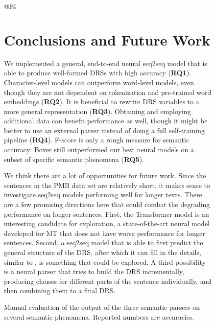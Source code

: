 \documentclass[11pt,a4paper]{article}
\begin{document}
\begin{figure*}[!t]
\begin{subfigure}{50mm}
{{\begin{tabular}[t]{@{}l@{}}
{\begin{table}[t]
\centering
{}
\caption{Manual evaluation of the output of the three semantic parsers on several semantic phenomena. Reported numbers are accuracies.}
\label{tab:manual_eval}
\end{table}

\section{Conclusions and Future Work}
\label{sec:conclusion}

We implemented a general, end-to-end neural seq2seq model that is able to produce well-formed DRSs with high accuracy (\textbf{RQ1}). Character-level models can outperform word-level models, even though they are not dependent on tokenization and pre-trained word embeddings (\textbf{RQ2}). It is beneficial to rewrite DRS variables to a more general representation (\textbf{RQ3}). Obtaining and employing additional data can benefit performance as well, though it might be better to use an external parser instead of doing a full self-training pipeline (\textbf{RQ4}). 
F-score is only a rough measure for semantic accuracy: Boxer still outperformed our best neural models on a subset of specific semantic phenomena (\textbf{RQ5}). 

We think there are a lot of opportunities for future work. Since the sentences in the PMB data set are relatively short, it makes sense to investigate seq2seq models performing well for longer texts. There are a few promising directions here that could combat the degrading performance on longer sentences. First, the Transformer model \cite{transformer:17} is an interesting candidate for exploration, a state-of-the-art neural model developed for MT that does not have worse performance for longer sentences. Second, a seq2seq model that is able to first predict the general structure of the DRS, after which it can fill in the details, similar to , is something that could be explored. A third possibility is a neural parser that tries to build the DRS incrementally, producing clauses for different parts of the sentence individually, and then combining them to a final DRS.

}
\end{tabular}}}
\end{subfigure}
\end{figure*}
\end{document}
